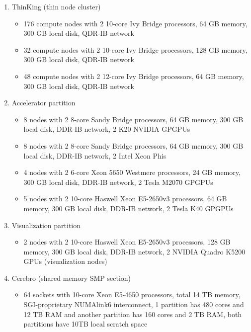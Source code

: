   \begin{enumerate}
     \item ThinKing (thin node cluster)
      \begin{itemize}
       \item  176 compute nodes with 2 10-core Ivy Bridge processors, 64 GB memory,
              300 GB local disk, QDR-IB network
       \item  32 compute nodes with 2 10-core Ivy Bridge processors, 128 GB memory,
              300 GB local disk, QDR-IB network
       \item  48 compute nodes with 2 12-core Ivy Bridge processors, 64 GB memory,
              300 GB local disk, QDR-IB network
      \end{itemize}
    \item Accelerator partition
      \begin{itemize}
       \item  8 nodes with 2 8-core Sandy Bridge processors, 64 GB memory,
              300 GB local disk, DDR-IB network, 2 K20 NVIDIA GPGPUs
       \item  8 nodes with 2 8-core Sandy Bridge processors, 64 GB memory,
              300 GB local disk, DDR-IB network, 2 Intel Xeon Phis
       \item  4 nodes with 2 6-core Xeon 5650 Westmere processors, 24 GB memory,
              300 GB local disk, DDR-IB network, 2 Tesla M2070 GPGPUs
       \item  5 nodes with 2 10-core Haswell Xeon E5-2650v3 processors, 64 GB memory,
              300 GB local disk, DDR-IB network, 2 Tesla K40 GPGPUs
      \end{itemize}
    \item Visualization partition
      \begin{itemize}
       \item  2 nodes with 2 10-core Haswell Xeon E5-2650v3 processors, 128 GB memory,
              300 GB local disk, DDR-IB network, 2 NVIDIA Quadro K5200 GPUs (visualization nodes)
      \end{itemize}
    \item Cerebro (shared memory SMP section)
      \begin{itemize}
        \item  64 sockets with 10-core Xeon E5-4650 processors, total 14 TB memory,
               SGI-proprietary NUMAlink6 interconnect,
               1 partition has 480 cores and 12 TB RAM and another partition has 160 cores and 2 TB RAM,
               both partitions have 10TB local scratch space
      \end{itemize}
  \end{enumerate}
